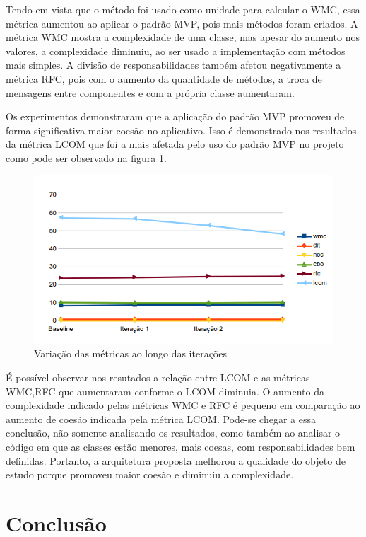 \documentclass[conference]{IEEEtran}
\begin{document}
Tendo em vista que o método foi usado como unidade para calcular o WMC, essa
métrica aumentou ao aplicar o padrão MVP, pois mais métodos foram criados. A
métrica WMC mostra a complexidade de uma classe, mas apesar do aumento nos
valores, a complexidade diminuiu, ao ser usado a implementação com métodos mais
simples.
A divisão de responsabilidades também afetou negativamente a métrica RFC, pois
com o aumento da quantidade de métodos, a troca de mensagens entre componentes
e com a própria classe aumentaram.

Os experimentos demonstraram que a aplicação do padrão MVP promoveu de forma
significativa maior coesão no aplicativo. Isso é demonstrado nos resultados da
métrica LCOM que foi a mais afetada pelo uso do padrão MVP no projeto como pode
ser observado na figura \ref{fig:allmetrics}.

\begin{figure}[htb]
	\includegraphics[scale=0.55]{img/allmetrics}
	\caption{\label{fig:allmetrics} Variação das métricas ao longo das iterações}
\end{figure}


É possível observar nos resutados a relação entre LCOM e as métricas 
WMC,RFC que aumentaram conforme o LCOM diminuia. O aumento da complexidade
indicado pelas métricas WMC e RFC é pequeno em comparação ao aumento de
coesão indicada pela métrica LCOM. Pode-se chegar a essa conclusão, não somente
analisando os resultados, como também ao analisar o código em que as classes
estão menores, mais coesas, com responsabilidades bem definidas. Portanto, a
arquitetura proposta melhorou a qualidade do objeto de estudo porque promoveu
maior coesão e diminuiu a complexidade.

\section{Conclusão} 
\end{document}
